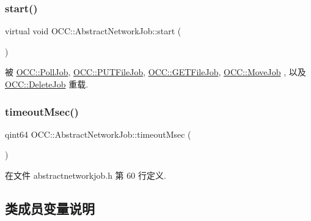 \mbox{\label{class_o_c_c_1_1_abstract_network_job_a256f1b6b5d6f6252e83b3602743da64a}} 
\subsubsection{\texorpdfstring{start()}{start()}}
{\footnotesize\ttfamily virtual void O\+C\+C\+::\+Abstract\+Network\+Job\+::start (\begin{DoxyParamCaption}{ }\end{DoxyParamCaption})\hspace{0.3cm}{\ttfamily [virtual]}}



被 \hyperlink{class_o_c_c_1_1_poll_job_a5d11e738f6759ecce57ebeb79cd5c9ac}{O\+C\+C\+::\+Poll\+Job}, \hyperlink{class_o_c_c_1_1_p_u_t_file_job_aae253a07a04a91cc89e2a4c97d86b3f8}{O\+C\+C\+::\+P\+U\+T\+File\+Job}, \hyperlink{class_o_c_c_1_1_g_e_t_file_job_a82c449dd18bb5ba12e611d0447662cdb}{O\+C\+C\+::\+G\+E\+T\+File\+Job}, \hyperlink{class_o_c_c_1_1_move_job_a0f963be47342b15bed2d961f743d0984}{O\+C\+C\+::\+Move\+Job} , 以及 \hyperlink{class_o_c_c_1_1_delete_job_a48875d9957b8186fdf8ae59b77cd4195}{O\+C\+C\+::\+Delete\+Job} 重载.

\mbox{\label{class_o_c_c_1_1_abstract_network_job_a6ac8f4ffd873d4e26eb5caacaebaeda3}} 
\subsubsection{\texorpdfstring{timeout\+Msec()}{timeoutMsec()}}
{\footnotesize\ttfamily qint64 O\+C\+C\+::\+Abstract\+Network\+Job\+::timeout\+Msec (\begin{DoxyParamCaption}{ }\end{DoxyParamCaption})}



在文件 abstractnetworkjob.\+h 第 60 行定义.



\subsection{类成员变量说明}
\mbox{\label{class_o_c_c_1_1_abstract_network_job_a5495f569442f06ad0ea646d9002d0525}} 
